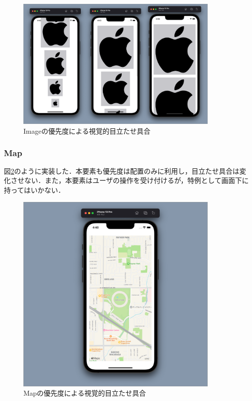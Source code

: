 \begin{figure}[htbp]
  \begin{minipage}{\hsize}
    \begin{center}
       \includegraphics[width=100mm]{img/Image_priority.png}
    \end{center}
    \caption{Imageの優先度による視覚的目立たせ具合}
    \label{fig:image_priority}
  \end{minipage}
\end{figure}

\subsubsection{Map}
図\ref{fig:map_priority}のように実装した．本要素も優先度は配置のみに利用し，目立たせ具合は変化させない．また，本要素はユーザの操作を受け付けるが，特例として画面下に持ってはいかない．
\begin{figure}[htbp]
  \begin{minipage}{\hsize}
    \begin{center}
       \includegraphics[width=100mm]{img/Map_priority.png}
    \end{center}
    \caption{Mapの優先度による視覚的目立たせ具合}
    \label{fig:map_priority}
  \end{minipage}
\end{figure}

